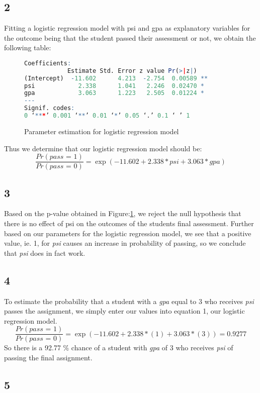\documentclass{article}
\begin{document}
    \subsection*{2}
    Fitting a logistic regression model with psi and gpa as explanatory variables for the outcome being that the student passed their assessment or not, we obtain the following table:
    	\begin{figure}[H]
    	\begin{lstlisting}[language=R]
	Coefficients:
            Estimate Std. Error z value Pr(>|z|)   
(Intercept)  -11.602      4.213  -2.754  0.00589 **
psi            2.338      1.041   2.246  0.02470 * 
gpa            3.063      1.223   2.505  0.01224 * 
---
Signif. codes:  
0 ‘***’ 0.001 ‘**’ 0.01 ‘*’ 0.05 ‘.’ 0.1 ‘ ’ 1
    	\end{lstlisting}
    	\caption{Parameter estimation for logistic regression model}
    	\label{fig:log_reg}
    \end{figure}
    
    Thus we determine that our logistic regression model should be:
    \begin{equation}
    \frac{Pr(\textit{pass = 1})}{Pr(\textit{pass = 0})} = \exp(-11.602 + 2.338*\textit{psi} + 3.063*\textit{gpa})
    \end{equation}
    \subsection*{3}
    Based on the p-value obtained in Figure:\ref{fig:log_reg}, we reject the null hypothesis that there is no effect of psi on the outcomes of the students final assessment. Further based on our parameters for the logistic regression model, we see that a positive value, ie. 1, for \textit{psi} causes an increase in probability of passing, so we conclude that \textit{psi} does in fact work.
    \subsection*{4}
    To estimate the probability that a student with a \textit{gpa} equal to 3 who receives \textit{psi} passes the assignment, we simply enter our values into equation 1, our logistic regression model.
    \[
    \frac{Pr(\textit{pass = 1})}{Pr(\textit{pass = 0})} = \exp(-11.602 + 2.338*(1) + 3.063*(3)) = 0.9277
    \]
    So there is a 92.77 \% chance of a student with \textit{gpa} of 3 who receives \textit{psi} of passing the final assignment.
    \subsection*{5}
\end{document}
